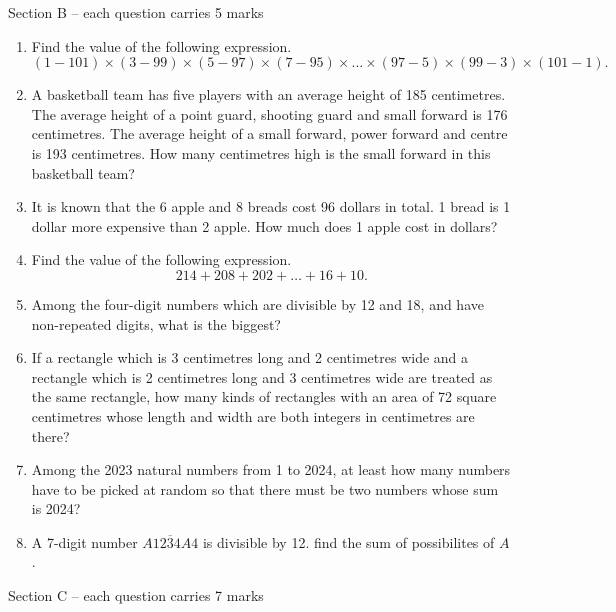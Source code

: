 \documentclass[11pt]{scrartcl}
\begin{document}
\newpage
Section B – each question carries 5 marks

\hrulefill %
\begin{enumerate}[resume]
    \item Find the value of the following expression.
    $$(1-101) \times (3-99) \times (5-97) \times (7-95) \times \ldots \times (97-5) \times (99-3) \times (101-1).$$
    
    \item \vspace{10cm} A basketball team has five players with an average height of 185 centimetres. The average height of a point guard, shooting guard and small forward is 176 centimetres. The average height of a small forward, power forward and centre is 193 centimetres. How many centimetres high is the small forward in this basketball team?

    \newpage

    \item \vspace{10cm} It is known that the 6 apple and 8 breads cost 96 dollars in total. 1 bread is 1 dollar more expensive than 2 apple. How much does 1 apple cost in dollars?

    \item \vspace{10cm} Find the value of the following expression.
    $$214+208+202+\dots+16+10.$$

    \newpage

    \item \vspace{10cm} Among the four-digit numbers which are divisible by 12 and 18, and have non-repeated digits, what is the biggest?

    \item \vspace{10cm} If a rectangle which is 3 centimetres long and 2 centimetres wide and a rectangle which is 2 centimetres long and 3 centimetres wide are treated as the same rectangle, how many kinds of rectangles with an area of 72 square centimetres whose length and width are both integers in centimetres are there?

    \newpage

    \item \vspace{10cm} Among the 2023 natural numbers from 1 to 2024, at least how many numbers have to be picked at random so that there must be two numbers whose sum is 2024?

    \item \vspace{10cm} A 7-digit number $\overline{A1234A4}$ is divisible by 12. find the sum of possibilites of $A$.

    \newpage
\end{enumerate}
\vspace{10cm}
\newpage
Section C – each question carries 7 marks
\end{document}
